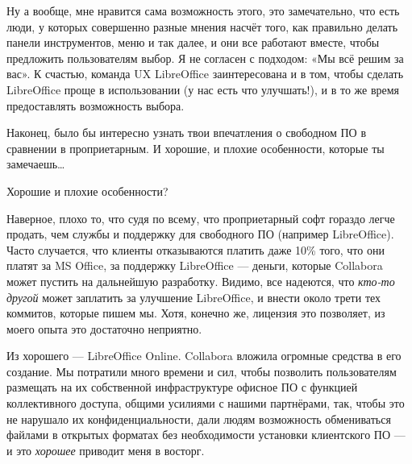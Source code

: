 \documentclass[10pt, a5paper]{article}
\begin{document}
\begin{Parallel}[p]{}{}
{Ну а вообще, мне нравится сама возможность этого, это замечательно, что есть люди, у которых совершенно разные мнения насчёт того, как правильно делать панели инструментов, меню и так далее, и они все работают вместе, чтобы предложить пользователям выбор. Я не согласен с подходом: «Мы всё решим за вас». К счастью, команда UX LibreOffice заинтересована и в том, чтобы сделать LibreOffice проще в использовании (у нас есть что улучшать!), и в то же время предоставлять возможность выбора.

\newpage
\q Наконец, было бы интересно узнать твои впечатления о свободном ПО в сравнении в проприетарным. И хорошие, и плохие особенности, которые ты замечаешь… 

\a Хорошие и плохие особенности?

Наверное, плохо то, что судя по всему, что проприетарный софт гораздо легче продать, чем службы и поддержку для свободного ПО (например LibreOffice). Часто случается, что клиенты отказываются платить даже 10\% того, что они платят за MS Office, за поддержку LibreOffice — деньги, которые Collabora может пустить на дальнейшую разработку. Видимо, все надеются, что \emph{кто-то другой} может заплатить за улучшение LibreOffice, и внести около трети тех коммитов, которые пишем мы. Хотя, конечно же, лицензия это позволяет, из моего опыта это достаточно неприятно.

Из хорошего — LibreOffice Online. Collabora вложила огромные средства в его создание. Мы потратили много времени и сил, чтобы позволить пользователям размещать на их собственной инфраструктуре офисное ПО с функцией коллективного доступа, общими усилиями с нашими партнёрами, так, чтобы это не нарушало их конфиденциальности, дали людям возможность обмениваться файлами в открытых форматах без необходимости установки клиентского ПО --- и это \emph{хорошее} приводит меня в восторг.

\vfill
     }
   \end{Parallel}









 
\end{document}
